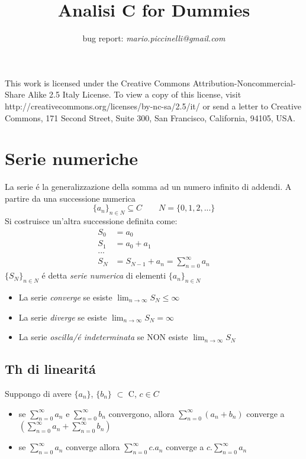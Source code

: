 \documentclass[a4paper,10pt,italian]{article}
\title{Analisi C for Dummies}
\author{bug report: \emph{mario.piccinelli@gmail.com}}
\begin{document}

\maketitle

This work is licensed under the Creative Commons Attribution-Noncommercial-Share Alike 2.5 Italy License. To view a copy of this license, visit http://creativecommons.org/licenses/by-nc-sa/2.5/it/ or send a letter to Creative Commons, 171 Second Street, Suite 300, San Francisco, California, 94105, USA.

\tableofcontents
\newpage

\section{Serie numeriche}
La serie \'e la generalizzazione della somma ad un numero infinito di addendi. A partire da una successione numerica
$$ \{ a_n \}_{n \in N} \subseteq C \qquad N=\{0,1,2,...\} $$
Si costruisce un'altra successione definita come:
\begin{align*}
S_0 &= a_0 \\
S_1 &= a_0+a_1 \\
... \\
S_N &= S_{N-1} + a_n = \sum_{n=0}^{\infty}a_n
\end{align*}
$\{S_N\}_{n \in N}$ \'e detta \emph{serie numerica} di elementi $\{a_n\}_{n\in N}$
\begin{itemize}
\item La serie \emph{converge} se esiste $\lim_{n\rightarrow \infty}S_N \leq \infty$
\item La serie \emph{diverge} se esiste $\lim_{n\rightarrow \infty}S_N = \infty$
\item La serie \emph{oscilla/\'e indeterminata} se NON esiste $\lim_{n\rightarrow \infty} S_N$
\end{itemize}

\subsection{Th di linearit\'a}
Suppongo di avere $\{a_n\}$, $\{b_n\}$ $\subset$ C, $c\in C$
\begin{itemize}
\item se $\sum_{n=0}^{\infty}a_n$ e $\sum_{n=0}^{\infty}b_n$ convergono, allora $\sum_{n=0}^{\infty}(a_n+b_n)$ converge a $(\sum_{n=0}^{\infty} a_n + \sum_{n=0}^{\infty} b_n) $
\item se $\sum_{n=0}^{\infty}a_n$ converge allora $\sum_{n=0}^{\infty}c.a_n$ converge a $c.\sum_{n=0}^{\infty} a_n$
\end{itemize}
\end{document}
